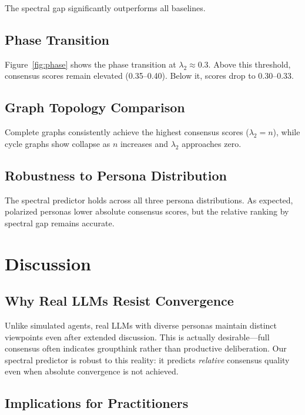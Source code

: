 \documentclass[10pt]{article}
\begin{document}
The spectral gap significantly outperforms all baselines.

\subsection{Phase Transition}

Figure~\ref{fig:phase} shows the phase transition at $\lambda_2 \approx 0.3$. Above this threshold, consensus scores remain elevated (0.35--0.40). Below it, scores drop to 0.30--0.33.


\subsection{Graph Topology Comparison}

Complete graphs consistently achieve the highest consensus scores ($\lambda_2 = n$), while cycle graphs show collapse as $n$ increases and $\lambda_2$ approaches zero.

\subsection{Robustness to Persona Distribution}

The spectral predictor holds across all three persona distributions. As expected, polarized personas lower absolute consensus scores, but the relative ranking by spectral gap remains accurate.

\section{Discussion}

\subsection{Why Real LLMs Resist Convergence}

Unlike simulated agents, real LLMs with diverse personas maintain distinct viewpoints even after extended discussion. This is actually desirable---full consensus often indicates groupthink rather than productive deliberation. Our spectral predictor is robust to this reality: it predicts \textit{relative} consensus quality even when absolute convergence is not achieved.

\subsection{Implications for Practitioners}
\end{document}
